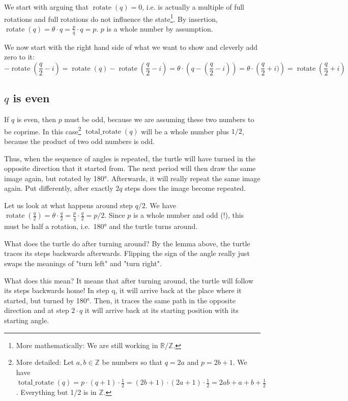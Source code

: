 \documentclass[pdftex,a4paper]{scrartcl}
\DeclareMathOperator{\rotate}{rotate}
\DeclareMathOperator{\total}{total\_rotate}
\begin{document}
We start with arguing that \(\rotate(q)=0\), i.e. is actually a multiple of full rotations and full rotations do not
influence the state\footnote{More mathematically: We are still working in \(\mathbb{R}/\mathbb{Z}\).}. By insertion,
\(\rotate(q)=\theta\cdot q=\frac{p}{q}\cdot q=p\). \(p\) is a whole number by assumption.

We now start with the right hand side of what we want to show and cleverly add zero to it:
\[
-\rotate(\frac{q}{2}-i)
=\rotate(q)-\rotate(\frac{q}{2}-i)
=\theta\cdot\left(q-(\frac{q}{2}-i)\right)
=\theta\cdot\left(\frac{q}{2}+i)\right)
=\rotate(\frac{q}{2}+i)
\]

\subsection{$q$ is even}
If \(q\) is even, then \(p\) must be odd, because we are assuming these two numbers to be coprime.
In this case\footnote{More detailed: Let \(a,b\in\mathbb{Z}\) be numbers so that \(q=2a\) and \(p=2b+1\). We have
\(\total(q)=p\cdot(q+1)\cdot\frac{1}{2}=(2b+1)\cdot(2a+1)\cdot\frac{1}{2}=2ab+a+b+\frac{1}{2}\). Everything but 1/2 is
in \(\mathbb{Z}\).}
\(\total(q)\) will be a whole number plus \(1/2\), because the product of two odd numbers is odd.

Thus, when the sequence of angles is repeated, the turtle will have turned in the opposite direction that it started
from. The next period will then draw
the same image again, but rotated by 180°. Afterwards, it will really repeat the same image again. Put differently,
after exactly \(2q\) steps does the image become repeated.

Let us look at what happens around step \(q/2\). We have \(\rotate(\frac{q}{2})=\theta\cdot \frac{q}{2}
= \frac{p}{q} \cdot \frac{q}{2} = p/2\). Since \(p\) is a whole number and odd (!), this must be half a rotation, i.e.\ 180° and the
turtle turns around.

What does the turtle do after turning around?
By the lemma above, the turtle traces its steps backwards afterwards. Flipping the sign of the angle really just swaps
the meanings of "turn left" and "turn right".

What does this mean? It means that after turning around, the turtle will follow its steps backwards home! In step
q, it will arrive back at the place where it started, but turned by 180°. Then, it traces the same path in the opposite
direction and at step \(2\cdot q\) it will arrive back at its starting position with its starting angle.
\end{document}
